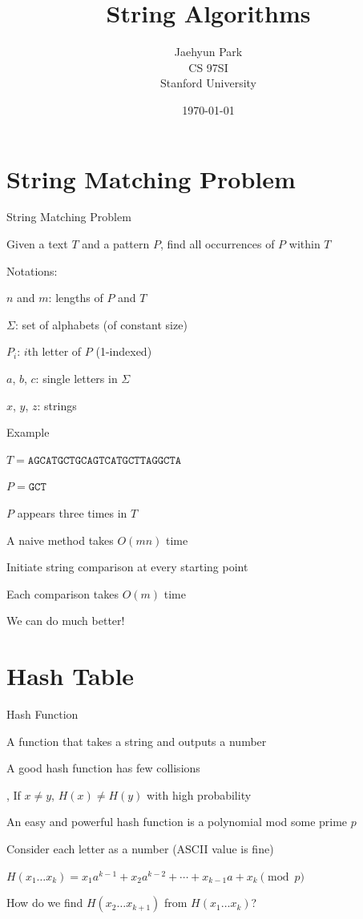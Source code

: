 \documentclass[13pt,onlymath]{beamer}
\title{\large \bfseries String Algorithms}
\author{Jaehyun Park\\[3ex]
CS 97SI\\
Stanford University}
\date{\today}
\begin{document}
\frame{
\thispagestyle{empty}
\titlepage
}

\section{String Matching Problem}

\begin{frame}{String Matching Problem}
\BIT
\item Given a text $T$ and a pattern $P$, find all occurrences of $P$ within $T$
\item Notations:
\BIT
\item $n$ and $m$: lengths of $P$ and $T$
\item $\Sigma$: set of alphabets (of constant size)
\item $P_i$: $i$th letter of $P$ (1-indexed)
\item $a$, $b$, $c$: single letters in $\Sigma$
\item $x$, $y$, $z$: strings
\EIT \EIT
\end{frame}

\begin{frame}{Example}
\BIT
\item $T = \mathtt{AGCATGCTGCAGTCATGCTTAGGCTA}$
\item $P = \mathtt{GCT}$
\item $P$ appears three times in $T$
\vfill
\item A naive method takes $O(mn)$ time
\BIT
\item Initiate string comparison at every starting point
\item Each comparison takes $O(m)$ time
\EIT
\vfill
\item We can do much better!
\EIT
\end{frame}


\section{Hash Table}

\begin{frame}{Hash Function}
\BIT
\item A function that takes a string and outputs a number
\item A good hash function has few collisions
\BIT
\item \ie, If $x\ne y$, $H(x) \ne H(y)$ with high probability
\EIT
\item An easy and powerful hash function is a polynomial mod some prime $p$
\BIT
\item Consider each letter as a number (ASCII value is fine)
\item $H(x_1 \ldots x_k) = x_1 a^{k-1} + x_2 a^{k-2} + \cdots + x_{k-1} a + x_k \pmod{p}$
\item How do we find $H(x_2 \ldots x_{k+1})$ from $H(x_1 \ldots x_k)$?
\EIT\EIT
\end{frame}
\end{document}
